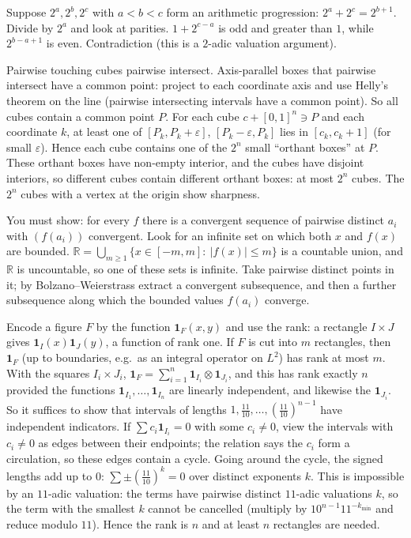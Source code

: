\documentclass[11pt,a4paper]{article}
\begin{document}

 Suppose $2^a,2^b,2^c$ with $a<b<c$ form an arithmetic progression: $2^a+2^c=2^{b+1}$. Divide by $2^a$ and look at parities.
 $1+2^{c-a}$ is odd and greater than $1$, while $2^{b-a+1}$ is even. Contradiction (this is a $2$-adic valuation argument).

 Pairwise touching cubes pairwise intersect. Axis-parallel boxes that pairwise intersect have a common point: project to each coordinate axis and use Helly's theorem on the line (pairwise intersecting intervals have a common point).
 So all cubes contain a common point $P$. For each cube $c+[0,1]^n\ni P$ and each coordinate $k$, at least one of $[P_k,P_k+\varepsilon]$, $[P_k-\varepsilon,P_k]$ lies in $[c_k,c_k+1]$ (for small $\varepsilon$). Hence each cube contains one of the $2^n$ small ``orthant boxes'' at $P$.
 These orthant boxes have non-empty interior, and the cubes have disjoint interiors, so different cubes contain different orthant boxes: at most $2^n$ cubes. The $2^n$ cubes with a vertex at the origin show sharpness.

 You must show: for every $f$ there is a convergent sequence of pairwise distinct $a_i$ with $(f(a_i))$ convergent. Look for an infinite set on which both $x$ and $f(x)$ are bounded.
 $\mathbb R=\bigcup_{m\ge1}\{x\in[-m,m]:\ |f(x)|\le m\}$ is a countable union, and $\mathbb R$ is uncountable, so one of these sets is infinite.
 Take pairwise distinct points in it; by Bolzano--Weierstrass extract a convergent subsequence, and then a further subsequence along which the bounded values $f(a_i)$ converge.

 Encode a figure $F$ by the function $\mathbf 1_F(x,y)$ and use the rank: a rectangle $I\times J$ gives $\mathbf 1_I(x)\mathbf 1_J(y)$, a function of rank one. If $F$ is cut into $m$ rectangles, then $\mathbf 1_F$ (up to boundaries, e.g.\ as an integral operator on $L^2$) has rank at most $m$.
 With the squares $I_i\times J_i$, $\mathbf 1_F=\sum_{i=1}^n\mathbf 1_{I_i}\otimes\mathbf 1_{J_i}$, and this has rank exactly $n$ provided the functions $\mathbf 1_{I_1},\dots,\mathbf 1_{I_n}$ are linearly independent, and likewise the $\mathbf 1_{J_i}$. So it suffices to show that intervals of lengths $1,\frac{11}{10},\dots,(\frac{11}{10})^{n-1}$ have independent indicators.
 If $\sum c_i\mathbf 1_{I_i}=0$ with some $c_i\ne0$, view the intervals with $c_i\ne0$ as edges between their endpoints; the relation says the $c_i$ form a circulation, so these edges contain a cycle. Going around the cycle, the signed lengths add up to $0$: $\sum\pm(\frac{11}{10})^{k}=0$ over distinct exponents $k$.
 This is impossible by an $11$-adic valuation: the terms have pairwise distinct $11$-adic valuations $k$, so the term with the smallest $k$ cannot be cancelled (multiply by $10^{n-1}11^{-k_{\min}}$ and reduce modulo $11$). Hence the rank is $n$ and at least $n$ rectangles are needed.
\end{document}
